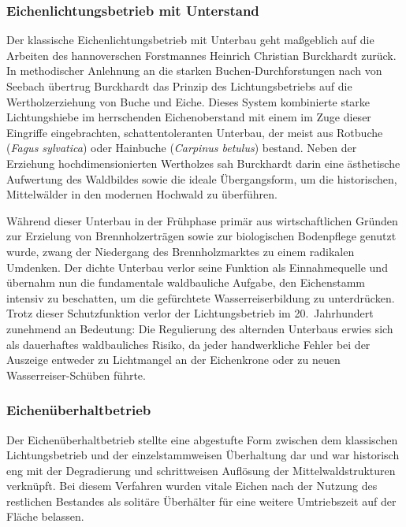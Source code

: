 \documentclass[twocolumn, bibliography=totoc, abstract=true]{scrartcl}
\begin{document}
\subsubsection{Eichenlichtungsbetrieb mit Unterstand}

Der klassische Eichenlichtungsbetrieb mit Unterbau geht maßgeblich auf die Arbeiten des hannoverschen Forstmannes Heinrich Christian Burckhardt zurück. In methodischer Anlehnung an die starken Buchen-Durchforstungen nach von Seebach übertrug Burckhardt das Prinzip des Lichtungsbetriebs auf die Wertholzerziehung von Buche und Eiche. Dieses System kombinierte starke Lichtungshiebe im herrschenden Eichenoberstand mit einem im Zuge dieser Eingriffe eingebrachten, schattentoleranten Unterbau, der meist aus Rotbuche (\textit{Fagus sylvatica}) oder Hainbuche (\textit{Carpinus betulus}) bestand. Neben der Erziehung hochdimensionierten Wertholzes sah Burckhardt darin eine ästhetische Aufwertung des Waldbildes sowie die ideale Übergangsform, um die historischen, Mittelwälder in den modernen Hochwald zu überführen.

Während dieser Unterbau in der Frühphase primär aus wirtschaftlichen Gründen zur Erzielung von Brennholzerträgen sowie zur biologischen Bodenpflege genutzt wurde, zwang der Niedergang des Brennholzmarktes zu einem radikalen Umdenken. Der dichte Unterbau verlor seine Funktion als Einnahmequelle und übernahm nun die fundamentale waldbauliche Aufgabe, den Eichenstamm intensiv zu beschatten, um die gefürchtete Wasserreiserbildung zu unterdrücken. Trotz dieser Schutzfunktion verlor der Lichtungsbetrieb im 20.~Jahrhundert zunehmend an Bedeutung: Die Regulierung des alternden Unterbaus erwies sich als dauerhaftes waldbauliches Risiko, da jeder handwerkliche Fehler bei der Auszeige entweder zu Lichtmangel an der Eichenkrone oder zu neuen Wasserreiser-Schüben führte.

\subsubsection{Eichenüberhaltbetrieb}

Der Eichenüberhaltbetrieb stellte eine abgestufte Form zwischen dem klassischen Lichtungsbetrieb und der einzelstammweisen Überhaltung dar und war historisch eng mit der Degradierung und schrittweisen Auflösung der Mittelwaldstrukturen verknüpft. Bei diesem Verfahren wurden vitale Eichen nach der Nutzung des restlichen Bestandes als solitäre Überhälter für eine weitere Umtriebszeit auf der Fläche belassen.
\end{document}
